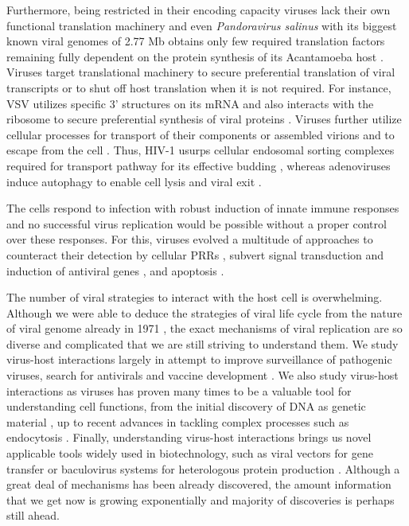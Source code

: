 	Furthermore, being restricted in their encoding capacity viruses lack their own functional translation machinery and even \textit{Pandoravirus salinus} with its biggest known viral genomes of 2.77 \gls{Mb} obtains only few required translation factors remaining fully dependent on the protein synthesis of its Acantamoeba host \parencite{Philippe2013}. Viruses target translational machinery to secure preferential translation of viral transcripts or to shut off host translation when it is not required. For instance, \gls{VSV} utilizes specific 3' structures on its mRNA and also interacts with the ribosome to secure preferential synthesis of viral proteins \parencite{Whitlow2006, Lee2013}. Viruses further utilize cellular processes for transport of their components or assembled virions and to escape from the cell \parencite{Bartenschlager2011, Lyles2013}. Thus, HIV-1 usurps cellular endosomal sorting complexes required for transport pathway for its effective budding \parencite{Morita2011}, whereas adenoviruses induce autophagy to enable cell lysis and viral exit \parencite{Jiang2011}.
	
	The cells respond to infection with robust induction of innate immune responses and no successful virus replication would be possible without a proper control over these responses. For this, viruses evolved a multitude of approaches to counteract their detection by cellular \glspl{PRR} \parencite{Zinzula2013}, subvert signal transduction and induction of antiviral genes \parencite{Short2009}, and apoptosis \parencite{Galluzzi2008}.
	
	The number of viral strategies to interact with the host cell is overwhelming. Although we were able to deduce the strategies of viral life cycle from the nature of viral genome already in 1971 \parencite{Baltimore1971}, the exact mechanisms of viral replication are so diverse and complicated that we are still striving to understand them. We study virus-host interactions largely in attempt to improve surveillance of pathogenic viruses, search for antivirals and vaccine development \parencite{Webby2003, Schwegmann2008}. We also study virus-host interactions as viruses has proven many times to be a valuable tool for understanding cell functions, from the initial discovery of DNA as genetic material \parencite{Hershey1952}, up to recent advances in tackling complex processes such as endocytosis \parencite{Pelkmans2003}. Finally, understanding virus-host interactions brings us novel applicable tools widely used in biotechnology, such as viral vectors for gene transfer \parencite{Vannucci2013} or baculovirus systems for heterologous protein production \parencite{VanOers2011}. Although a great deal of mechanisms has been already discovered, the amount information that we get now is growing exponentially and majority of discoveries is perhaps still ahead. 
		
